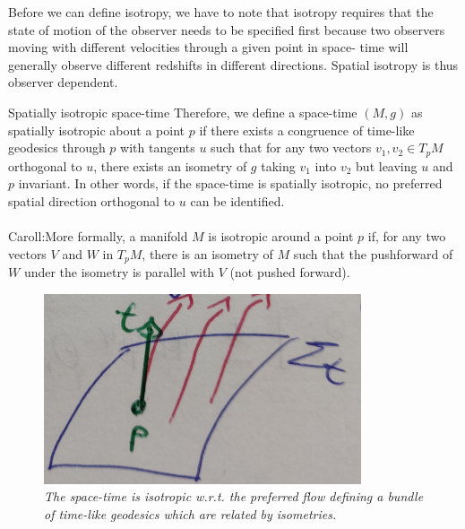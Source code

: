	Before we can define isotropy, we have to note that isotropy requires that
	the state of motion of the observer needs to be specified first because two
	observers moving with different velocities through a given point in space-
	time will generally observe different redshifts in different directions. Spatial isotropy is thus observer dependent.
	\begin{mybox}{Spatially isotropic space-time}
	Therefore, we define a space-time $(M, g)$ as spatially isotropic about a
	point $p$ if there exists a congruence of time-like geodesics through $p$
	with tangents $u$ such that for any two vectors $v_1 , v_2 \in T_p M$ orthogonal
	to $u$, there exists an isometry of $g$ taking $v_1$ into $v_2$ but leaving $u$ and
	$p$ invariant. In other words, if the space-time is spatially isotropic, no
	preferred spatial direction orthogonal to $u$ can be identified.\\
	\\Caroll:More formally, a manifold $M$ is isotropic around a point $p$ if, for any two vectors $V$ and $W$
	in $T_p M$, there is an isometry of $M$ such that the pushforward of $W$ under the isometry is
	parallel with $V$ (not pushed forward).
	\end{mybox}
\begin{figure}
	\centering
	\includegraphics[width=0.7\linewidth]{gfx/IsotropicSpacetime}
	\caption{\itshape The space-time is isotropic w.r.t. the preferred flow defining a bundle of time-like geodesics which are related by isometries.}
	\label{fig:isotropicspacetime}
\end{figure}


